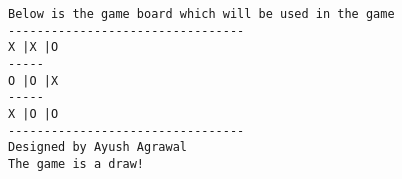 \documentclass[11pt]{article}
\begin{document}
    \begin{Verbatim}[commandchars=\\\{\}]
Below is the game board which will be used in the game
---------------------------------
X |X |O
-----
O |O |X
-----
X |O |O
---------------------------------
Designed by Ayush Agrawal
The game is a draw!

    \end{Verbatim}


    
    
    
    
\end{document}
